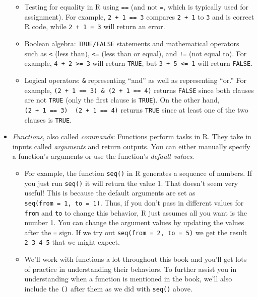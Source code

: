 \documentclass[]{book}
\providecommand{\tightlist}{%
  \setlength{\itemsep}{0pt}\setlength{\parskip}{0pt}}
\begin{document}
\begin{itemize}
  \begin{itemize}
  \tightlist
  \item
    Testing for equality in R using \texttt{==} (and not \texttt{=}, which is typically used for assignment). For example, \texttt{2\ +\ 1\ ==\ 3} compares \texttt{2\ +\ 1} to \texttt{3} and is correct R code, while \texttt{2\ +\ 1\ =\ 3} will return an error.
  \item
    Boolean algebra: \texttt{TRUE/FALSE} statements and mathematical operators such as \texttt{\textless{}} (less than), \texttt{\textless{}=} (less than or equal), and \texttt{!=} (not equal to).  For example, \texttt{4\ +\ 2\ \textgreater{}=\ 3} will return \texttt{TRUE}, but \texttt{3\ +\ 5\ \textless{}=\ 1} will return \texttt{FALSE}.
  \item
    Logical operators: \texttt{\&} representing ``and'' as well as \texttt{\textbar{}} representing ``or.'' For example, \texttt{(2\ +\ 1\ ==\ 3)\ \&\ (2\ +\ 1\ ==\ 4)} returns \texttt{FALSE} since both clauses are not \texttt{TRUE} (only the first clause is \texttt{TRUE}). On the other hand, \texttt{(2\ +\ 1\ ==\ 3)\ \textbar{}\ (2\ +\ 1\ ==\ 4)} returns \texttt{TRUE} since at least one of the two clauses is \texttt{TRUE}.
  \end{itemize}
\item
  \emph{Functions}, also called \emph{commands}: Functions perform tasks in R. They take in inputs called \emph{arguments} and return outputs. You can either manually specify a function's arguments or use the function's \emph{default values}. 

  \begin{itemize}
  \tightlist
  \item
    For example, the function \texttt{seq()} in R generates a sequence of numbers. If you just run \texttt{seq()} it will return the value 1. That doesn't seem very useful! This is because the default arguments are set as \texttt{seq(from\ =\ 1,\ to\ =\ 1)}. Thus, if you don't pass in different values for \texttt{from} and \texttt{to} to change this behavior, R just assumes all you want is the number 1. You can change the argument values by updating the values after the \texttt{=} sign. If we try out \texttt{seq(from\ =\ 2,\ to\ =\ 5)} we get the result \texttt{2\ 3\ 4\ 5} that we might expect.
  \item
    We'll work with functions a lot throughout this book and you'll get lots of practice in understanding their behaviors. To further assist you in understanding when a function is mentioned in the book, we'll also include the \texttt{()} after them as we did with \texttt{seq()} above.
  \end{itemize}
\end{itemize}
\end{document}
